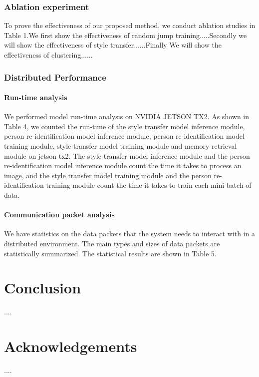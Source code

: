 \documentclass{article}
\begin{document}
\subsubsection{Ablation experiment}
To prove the effectiveness of our proposed method,  we conduct ablation studies in Table 1.We first show the effectiveness of random jump training.....Secondly we will show the effectiveness of style transfer......Finally We will show the effectiveness of clustering......


\subsubsection{Distributed Performance}
\paragraph{Run-time analysis}
We performed model run-time analysis on NVIDIA JETSON TX2. As shown in Table 4, we counted the run-time of the style transfer model inference module, person re-identification model inference module, person re-identification model training module, style transfer model training module and memory retrieval module on jetson tx2. The style transfer model inference module and the person re-identification model inference module count the time it takes to process an image, and the style transfer model training module and the person re-identification training module count the time it takes to train each mini-batch of data.

\paragraph{Communication packet analysis} 
We have statistics on the data packets that the system needs to interact with in a distributed environment. The main types and sizes of data packets are statistically summarized. The statistical results are shown in Table 5.


\section{Conclusion}
....

\section{Acknowledgements}
....



\end{document}
